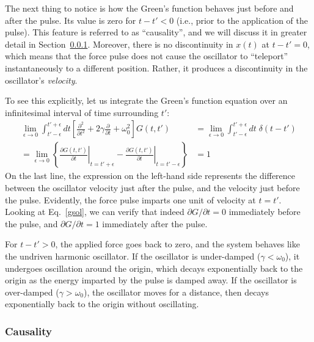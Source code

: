 \documentclass[10pt,a4paper]{article}
\begin{document}
The next thing to notice is how the Green's function behaves just
before and after the pulse. Its value is zero for $t - t' < 0$ (i.e.,
prior to the application of the pulse). This feature is referred to as
``causality'', and we will discuss it in greater detail in
Section~\ref{causality}. Moreover, there is no discontinuity in $x(t)$
at $t - t' = 0$, which means that the force pulse does not cause the
oscillator to ``teleport'' instantaneously to a different position.
Rather, it produces a discontinuity in the oscillator's
\emph{velocity}.

To see this explicitly, let us integrate the Green's function equation
over an infinitesimal interval of time surrounding $t'$:
\begin{align}
  \lim_{\epsilon \rightarrow 0} \int_{t'-\epsilon}^{t'+\epsilon} dt \left[\frac{\partial^2}{\partial t^2} + 2\gamma\frac{\partial}{\partial t} + \omega_0^2\right] G(t,t') &= \lim_{\epsilon \rightarrow 0} \int_{t'-\epsilon}^{t'+\epsilon} dt \; \delta(t-t') \\ = \lim_{\epsilon \rightarrow 0} \left\{ \left.\frac{\partial G(t,t')}{\partial t}\right|_{t = t' +\epsilon} - \left.\frac{\partial G(t,t')}{\partial t}\right|_{t = t' - \epsilon}\right\} &= 1
\end{align}
On the last line, the expression on the left-hand side represents the
difference between the oscillator velocity just after the pulse, and
the velocity just before the pulse. Evidently, the force pulse imparts
one unit of velocity at $t=t'$.  Looking at Eq.~\eqref{gsol}, we can
verify that indeed $\partial G/\partial t = 0$ immediately before the
pulse, and $\partial G/\partial t = 1$ immediately after the pulse.

For $t - t' > 0$, the applied force goes back to zero, and the system
behaves like the undriven harmonic oscillator. If the oscillator is
under-damped ($\gamma < \omega_0$), it undergoes oscillation around
the origin, which decays exponentially back to the origin as the energy
imparted by the pulse is damped away. If the oscillator is over-damped
($\gamma > \omega_0$), the oscillator moves for a distance, then
decays exponentially back to the origin without oscillating.

\subsubsection{Causality}
\label{causality}
\end{document}
